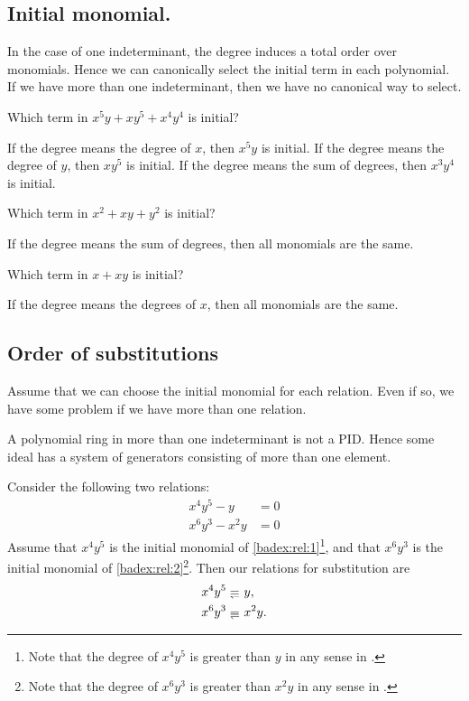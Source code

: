 \subsection{Initial monomial.}
In the case of one indeterminant,
the degree induces a total order over monomials.
Hence we can canonically select the initial term in each polynomial.
If we have more than one indeterminant,
then we have no canonical way to select.
\begin{example}
  \label{ex:degree}
  Which term in $x^5y+xy^5+x^4y^4$ is initial?

  If the degree means the degree of $x$,
  then $x^5y$ is initial.
  If the degree means the degree of $y$,
  then $xy^5$ is initial.
  If the degree means the sum of degrees,
  then $x^3y^4$ is initial.  
\end{example}


\begin{example}
  Which term in $x^2+xy+y^2$ is initial?

  If the degree means the sum of degrees,
  then all monomials are the same.
\end{example}

\begin{example}
  Which term in $x+xy$ is initial?

  If the degree means the degrees of $x$,
  then all monomials are the same.
\end{example}



\subsection{Order of substitutions}
\label{subsec:nonunique}
Assume that we can choose the initial monomial for each relation.
Even if so,
we have some problem if we have more than one relation.

\begin{remark}
    A polynomial ring in more than one indeterminant is not a PID.
    Hence some ideal has a system of generators consisting of
    more than one element.
\end{remark}



Consider the following two relations:
\begin{align}
x^4y^5-y&=0 \label{badex:rel:1}\\
x^6y^3-x^2y&=0 \label{badex:rel:2}   
\end{align}
Assume that
$x^4y^5$ is the initial monomial of \cref{badex:rel:1}\footnote{Note that the degree of $x^4y^5$ is greater than $y$ in any sense in .},
and that
$x^6y^3$ is the initial monomial of \cref{badex:rel:2}\footnote{Note that the degree of $x^6y^3$ is greater than $x^2y$ in any sense in .}.
Then
our relations for substitution are
\begin{align}
x^4y^5&\denotes y, \label{badex:relsub:1}\\
x^6y^3&\denotes x^2y. \label{badex:relsub:2}   
\end{align}

